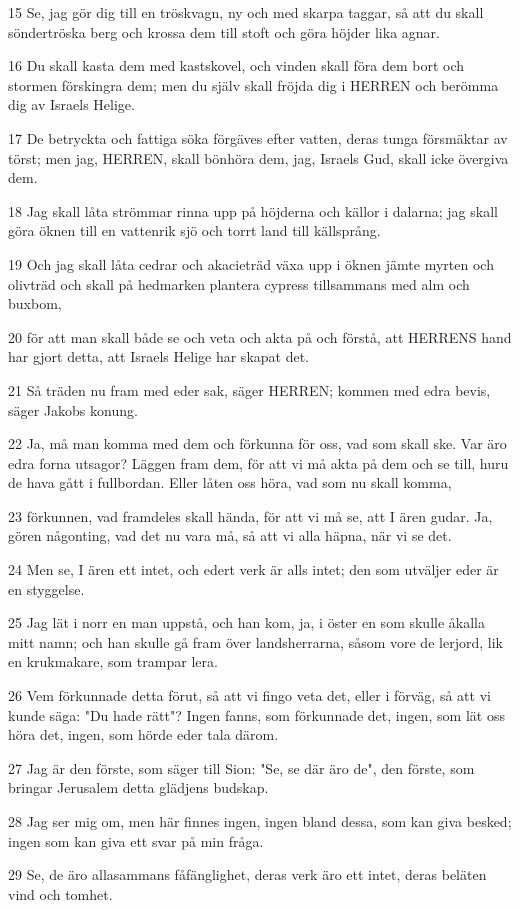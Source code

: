 \par 15 Se, jag gör dig till en tröskvagn, ny och med skarpa taggar, så att du skall söndertröska berg och krossa dem till stoft och göra höjder lika agnar.
\par 16 Du skall kasta dem med kastskovel, och vinden skall föra dem bort och stormen förskingra dem; men du själv skall fröjda dig i HERREN och berömma dig av Israels Helige.
\par 17 De betryckta och fattiga söka förgäves efter vatten, deras tunga försmäktar av törst; men jag, HERREN, skall bönhöra dem, jag, Israels Gud, skall icke övergiva dem.
\par 18 Jag skall låta strömmar rinna upp på höjderna och källor i dalarna; jag skall göra öknen till en vattenrik sjö och torrt land till källsprång.
\par 19 Och jag skall låta cedrar och akacieträd växa upp i öknen jämte myrten och olivträd och skall på hedmarken plantera cypress tillsammans med alm och buxbom,
\par 20 för att man skall både se och veta och akta på och förstå, att HERRENS hand har gjort detta, att Israels Helige har skapat det.
\par 21 Så träden nu fram med eder sak, säger HERREN; kommen med edra bevis, säger Jakobs konung.
\par 22 Ja, må man komma med dem och förkunna för oss, vad som skall ske. Var äro edra forna utsagor? Läggen fram dem, för att vi må akta på dem och se till, huru de hava gått i fullbordan. Eller låten oss höra, vad som nu skall komma,
\par 23 förkunnen, vad framdeles skall hända, för att vi må se, att I ären gudar. Ja, gören någonting, vad det nu vara må, så att vi alla häpna, när vi se det.
\par 24 Men se, I ären ett intet, och edert verk är alls intet; den som utväljer eder är en styggelse.
\par 25 Jag lät i norr en man uppstå, och han kom, ja, i öster en som skulle åkalla mitt namn; och han skulle gå fram över landsherrarna, såsom vore de lerjord, lik en krukmakare, som trampar lera.
\par 26 Vem förkunnade detta förut, så att vi fingo veta det, eller i förväg, så att vi kunde säga: "Du hade rätt"? Ingen fanns, som förkunnade det, ingen, som lät oss höra det, ingen, som hörde eder tala därom.
\par 27 Jag är den förste, som säger till Sion: "Se, se där äro de", den förste, som bringar Jerusalem detta glädjens budskap.
\par 28 Jag ser mig om, men här finnes ingen, ingen bland dessa, som kan giva besked; ingen som kan giva ett svar på min fråga.
\par 29 Se, de äro allasammans fåfänglighet, deras verk äro ett intet, deras beläten vind och tomhet.

